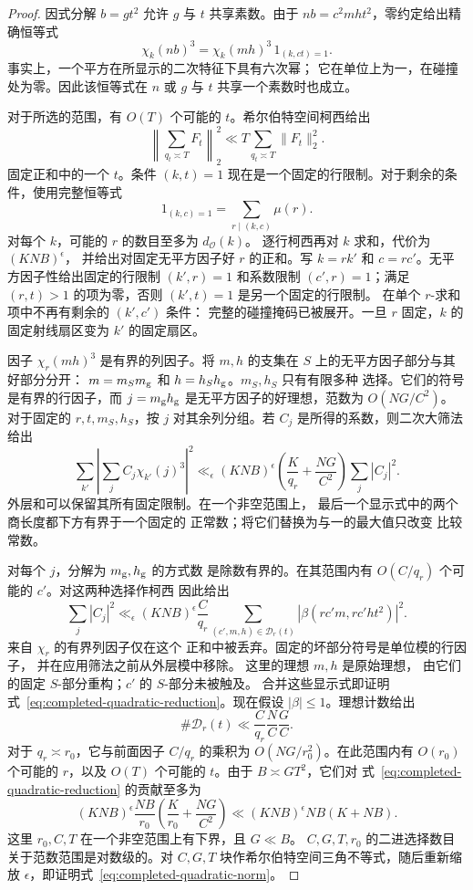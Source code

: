 \documentclass[11pt,a4paper]{article}
\numberwithin{equation}{section}
\numberwithin{figure}{section}
\theoremstyle{definition}
\theoremstyle{remark}
\begin{document}
\begin{proof}
因式分解 $b=gt^2$ 允许 $g$ 与 $t$ 共享素数。由于
$nb=c^2mht^2$，零约定给出精确恒等式
\begin{equation}\label{eq:completed-quadratic-zero-mask}
 \chi_k(nb)^3=\chi_k(mh)^3\,1_{(k,ct)=1}.
\end{equation}
事实上，一个平方在所显示的二次特征下具有六次幂；
它在单位上为一，在碰撞处为零。因此该恒等式在 $n$ 或 $g$ 与 $t$ 共享一个素数时也成立。

对于所选的范围，有 $O(T)$ 个可能的 $t$。希尔伯特空间柯西给出
\[
 \left\|\sum_{q_t\asymp T}F_t\right\|_2^2
 \ll T\sum_{q_t\asymp T}\|F_t\|_2^2.
\]
固定正和中的一个 $t$。条件 $(k,t)=1$ 现在是一个固定的行限制。对于剩余的条件，使用完整恒等式
\[
 1_{(k,c)=1}=\sum_{r\mid(k,c)}\mu(r).
\]
对每个 $k$，可能的 $r$ 的数目至多为 $d_{\mathcal O}(k)$。
逐行柯西再对 $k$ 求和，代价为 $(KNB)^\epsilon$，
并给出对固定无平方因子好 $r$ 的正和。写
$k=rk'$ 和 $c=rc'$。无平方因子性给出固定的行限制
$(k',r)=1$ 和系数限制 $(c',r)=1$；满足 $(r,t)>1$ 的项为零，否则 $(k',t)=1$ 是另一个固定的行限制。
在单个 $r$-求和项中不再有剩余的 $(k',c')$ 条件：
完整的碰撞掩码已被展开。一旦 $r$ 固定，$k$ 的固定射线扇区变为 $k'$ 的固定扇区。

因子 $\chi_r(mh)^3$ 是有界的列因子。将 $m,h$ 的支集在 $S$ 上的无平方因子部分与其好部分分开：
$m=m_Sm_{\rm g}$ 和 $h=h_Sh_{\rm g}$。$m_S,h_S$ 只有有限多种
选择。它们的符号是有界的行因子，而
$j=m_{\rm g}h_{\rm g}$ 是无平方因子的好理想，范数为 $O(NG/C^2)$。
对于固定的 $r,t,m_S,h_S$，按 $j$ 对其余列分组。若 $C_j$
是所得的系数，则二次大筛法给出
\[
 \sum_{k'}\left|\sum_j C_j\chi_{k'}(j)^3\right|^2
 \ll_\epsilon (KNB)^\epsilon
       \left(\frac K{q_r}+\frac{NG}{C^2}\right)\sum_j|C_j|^2.
\]
外层和可以保留其所有固定限制。在一个非空范围上，
最后一个显示式中的两个商长度都下方有界于一个固定的
正常数；将它们替换为与一的最大值只改变
比较常数。

对每个 $j$，分解为 $m_{\rm g},h_{\rm g}$ 的方式数
是除数有界的。在其范围内有 $O(C/q_r)$ 个可能的 $c'$。对这两种选择作柯西
因此给出
\[
 \sum_j|C_j|^2
 \ll_\epsilon (KNB)^\epsilon\frac C{q_r}
 \sum_{(c',m,h)\in\mathcal D_r(t)}
          |\beta(rc'm,rc'ht^2)|^2.
\]
来自 $\chi_r$ 的有界列因子仅在这个
正和中被丢弃。固定的坏部分符号是单位模的行因子，
并在应用筛法之前从外层模中移除。
这里的理想 $m,h$ 是原始理想，
由它们的固定 $S$-部分重构；$c'$ 的 $S$-部分未被触及。
合并这些显示式即证明式~\eqref{eq:completed-quadratic-reduction}。现在假设 $|\beta|\le1$。理想计数给出
\[
 \#\mathcal D_r(t)\ll
       \frac C{q_r}\frac NC\frac GC.
\]
对于 $q_r\asymp r_0$，它与前面因子 $C/q_r$ 的乘积为
$O(NG/r_0^2)$。在此范围内有 $O(r_0)$ 个可能的 $r$，以及 $O(T)$
个可能的 $t$。由于 $B\asymp GT^2$，它们对
式~\eqref{eq:completed-quadratic-reduction} 的贡献至多为
\[
 (KNB)^\epsilon\frac{NB}{r_0}
       \left(\frac K{r_0}+\frac{NG}{C^2}\right)
 \ll (KNB)^\epsilon NB(K+NB).
\]
这里 $r_0,C,T$ 在一个非空范围上有下界，且 $G\ll B$。
$C,G,T,r_0$ 的二进选择数目关于范数范围是对数级的。对 $C,G,T$ 块作希尔伯特空间三角不等式，随后重新缩放 $\epsilon$，即证明式~\eqref{eq:completed-quadratic-norm}。
\end{proof}
\end{document}
